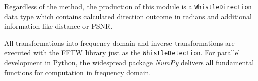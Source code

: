Regardless of the method, the production of this module is a
\lstinline!WhistleDirection! data type which contains calculated
direction outcome in radians and additional information like distance or \ac{PSNR}.

All transformations into frequency domain and inverse transformations
are executed with the \ac{FFTW} library just as the \lstinline!WhistleDetection!.
For parallel development in Python, the widespread package \textit{NumPy}  delivers
all fundamental functions for computation in frequency domain.






